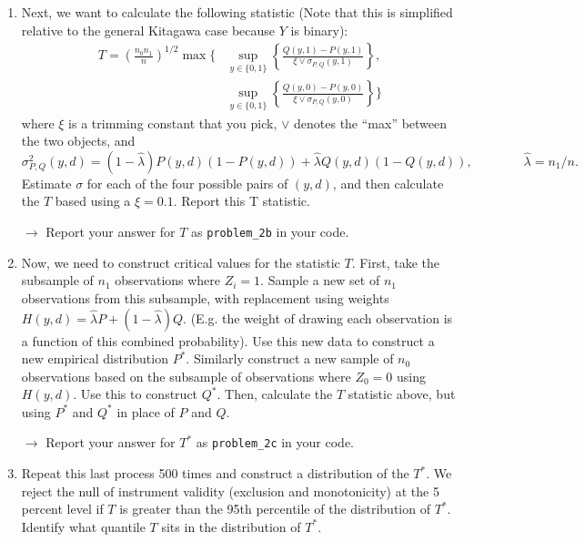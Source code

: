 \documentclass[11pt, a4paper]{article}
\begin{document}
\begin{enumerate}
\begin{enumerate}
  \item Next, we want to calculate the following statistic (Note that this is simplified relative to the general Kitagawa case because $Y$ is binary):
    \begin{align*}
      T = \left(\frac{n_{0}n_{1}}{n}\right)^{1/2} \max \bigl\{&\sup_{y\in \{0,1\}} \left\{\frac{Q(y,1) - P(y,1)}{\xi \vee \sigma_{P,Q}(y,1)}\right\},\\
      &\sup_{y\in \{0,1\}} \left\{\frac{Q(y,0) - P(y,0)}{\xi \vee \sigma_{P,Q}(y,0)}\right\}\bigr\}
    \end{align*}
    where $\xi$ is a trimming constant that you pick, $\vee$ denotes the ``max'' between the two objects, and
    \begin{equation*}
      \sigma^{2}_{P,Q}(y,d) = (1-\hat{\lambda})P(y,d)(1-P(y,d)) + \hat{\lambda}Q(y,d)(1-Q(y,d)), \qquad \qquad \hat{\lambda} = n_{1}/n.
    \end{equation*}
    Estimate $\sigma$ for each of the four possible pairs of $(y,d)$,
    and then calculate the $T$ based using a $\xi = 0.1$. Report this T statistic.
    
        \hspace{10pt} $\rightarrow$ Report your answer for $T$ as \texttt{problem\_2b} in your code.
        
  \item Now, we need to construct critical values for the statistic
    $T$. First, take the subsample of $n_{1}$ observations where
    $Z_{i}=1$. Sample a new set of $n_{1}$ observations from this
    subsample, with replacement using weights
    $H(y,d) = \hat{\lambda}P + (1-\hat{\lambda})Q$. (E.g. the weight
    of drawing each observation is a function of this combined
    probability). Use this new data to construct a new empirical
    distribution $P^{*}$. Similarly construct a new sample of $n_{0}$
    observations based on the subsample of observations where
    $Z_{0} = 0$ using $H(y,d)$. Use this to construct $Q^{*}$. Then,
    calculate the $T$ statistic above, but using $P^{*}$ and $Q^{*}$
    in place of $P$ and $Q$.
    
        \hspace{10pt} $\rightarrow$ Report your answer for $T^{*}$ as \texttt{problem\_2c} in your code.
        
  \item Repeat this last process 500 times and construct a
    distribution of the $T^{*}$. We reject the null of instrument
    validity (exclusion and monotonicity) at the 5 percent level if
    $T$ is greater than the 95th percentile of the distribution of
    $T^{*}$. Identify what quantile $T$ sits in the distribution of
    $T^{*}$.
    

\end{enumerate}
\end{enumerate}
\end{document}
